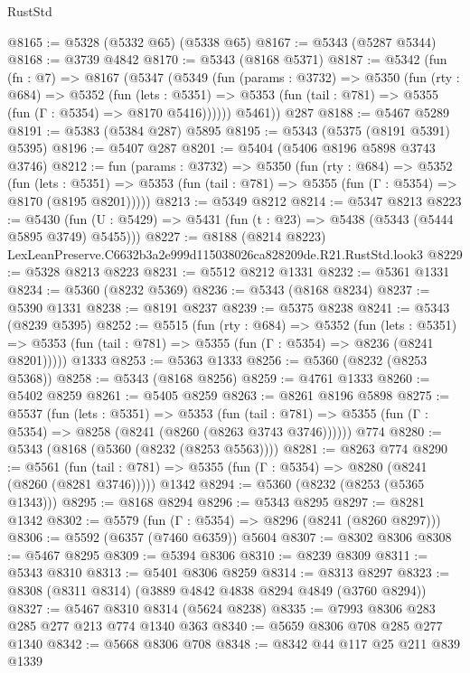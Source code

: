 \begin{lexlean}{RustStd}
\begin{coremodule}
@8165 := @5328 (@5332 @65) (@5338 @65)
@8167 := @5343 (@5287 @5344)
@8168 := @3739 @4842
@8170 := @5343 (@8168 @5371)
@8187 := @5342
    (fun (fn : @7) =>
    @8167
      (@5347
        (@5349
          (fun (params : @3732) =>
          @5350
            (fun (rty : @684) =>
            @5352
              (fun (lets : @5351) =>
              @5353 (fun (tail : @781) => @5355 (fun (Γ : @5354) => @8170 @5416))))))
        @5461))
    @287
@8188 := @5467 @5289
@8191 := @5383 (@5384 @287) @5895
@8195 := @5343 (@5375 (@8191 @5391) @5395)
@8196 := @5407 @287
@8201 := @5404 (@5406 @8196 @5898 @3743 @3746)
@8212 := fun (params : @3732) =>
  @5350
    (fun (rty : @684) =>
    @5352
      (fun (lets : @5351) =>
      @5353 (fun (tail : @781) => @5355 (fun (Γ : @5354) => @8170 (@8195 @8201)))))
@8213 := @5349 @8212
@8214 := @5347 @8213
@8223 := @5430 (fun (U : @5429) => @5431 (fun (t : @23) => @5438 (@5343 (@5444 @5895 @3749) @5455)))
@8227 := @8188 (@8214 @8223) LexLeanPreserve.C6632b3a2e999d115038026ca828209de.R21.RustStd.look3
@8229 := @5328 @8213 @8223
@8231 := @5512 @8212 @1331
@8232 := @5361 @1331
@8234 := @5360 (@8232 @5369)
@8236 := @5343 (@8168 @8234)
@8237 := @5390 @1331
@8238 := @8191 @8237
@8239 := @5375 @8238
@8241 := @5343 (@8239 @5395)
@8252 := @5515
    (fun (rty : @684) =>
    @5352
      (fun (lets : @5351) =>
      @5353 (fun (tail : @781) => @5355 (fun (Γ : @5354) => @8236 (@8241 @8201)))))
    @1333
@8253 := @5363 @1333
@8256 := @5360 (@8232 (@8253 @5368))
@8258 := @5343 (@8168 @8256)
@8259 := @4761 @1333
@8260 := @5402 @8259
@8261 := @5405 @8259
@8263 := @8261 @8196 @5898
@8275 := @5537
    (fun (lets : @5351) =>
    @5353
      (fun (tail : @781) => @5355 (fun (Γ : @5354) => @8258 (@8241 (@8260 (@8263 @3743 @3746))))))
    @774
@8280 := @5343 (@8168 (@5360 (@8232 (@8253 @5563))))
@8281 := @8263 @774
@8290 := @5561
    (fun (tail : @781) => @5355 (fun (Γ : @5354) => @8280 (@8241 (@8260 (@8281 @3746)))))
    @1342
@8294 := @5360 (@8232 (@8253 (@5365 @1343)))
@8295 := @8168 @8294
@8296 := @5343 @8295
@8297 := @8281 @1342
@8302 := @5579 (fun (Γ : @5354) => @8296 (@8241 (@8260 @8297)))
@8306 := @5592 (@6357 (@7460 @6359)) @5604
@8307 := @8302 @8306
@8308 := @5467 @8295
@8309 := @5394 @8306
@8310 := @8239 @8309
@8311 := @5343 @8310
@8313 := @5401 @8306 @8259
@8314 := @8313 @8297
@8323 := @8308 (@8311 @8314) (@3889 @4842 @4838 @8294 @4849 (@3760 @8294))
@8327 := @5467 @8310 @8314 (@5624 @8238)
@8335 := @7993 @8306 @283 @285 @277 @213 @774 @1340 @363
@8340 := @5659 @8306 @708 @285 @277 @1340
@8342 := @5668 @8306 @708
@8348 := @8342 @44 @117 @25 @211 @839 @1339

\end{coremodule}
\end{lexlean}
